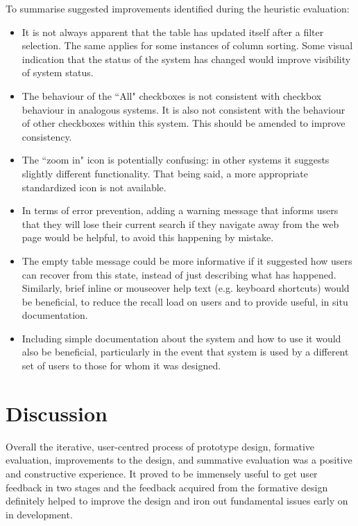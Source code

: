 To summarise suggested improvements identified during the heuristic evaluation:
\begin{itemize}
 \item It is not always apparent that the table has updated itself after a filter selection. The same applies for some instances of column sorting. Some visual indication that the status of the system has changed would improve visibility of system status. 
 \item The behaviour of the ``All" checkboxes is not consistent with checkbox behaviour in analogous systems. It is also not consistent with the behaviour of other checkboxes within this system. This should be amended to improve consistency.  
 \item The ``zoom in" icon is potentially confusing: in other systems it suggests slightly different functionality. That being said, a more appropriate standardized icon is not available. 
 \item In terms of error prevention, adding a warning message that informs users that they will lose their current search if they navigate away from the web page would be helpful, to avoid this happening by mistake. 
 \item The empty table message could be more informative if it suggested how users can recover from this state, instead of just describing what has happened. Similarly, brief inline or mouseover help text (e.g. keyboard shortcuts) would be beneficial, to reduce the recall load on users and to provide useful, in situ documentation. 
 \item Including simple documentation about the system and how to use it would also be beneficial, particularly in the event that system is used by a different set of users to those for whom it was designed. 
\end{itemize}


\section{Discussion}
Overall the iterative, user-centred process of prototype design, formative evaluation, improvements to the design, and summative evaluation was a positive and constructive experience. It proved to be immensely useful to get user feedback in two stages and the feedback acquired from the formative design definitely helped to improve the design and iron out fundamental issues early on in development.

